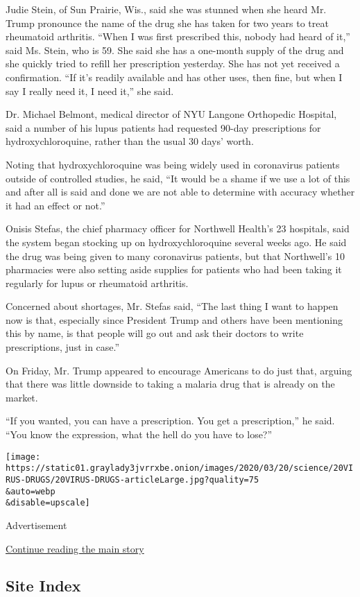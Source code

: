 Judie Stein, of Sun Prairie, Wis., said she was stunned when she heard
Mr. Trump pronounce the name of the drug she has taken for two years to
treat rheumatoid arthritis. ``When I was first prescribed this, nobody
had heard of it,'' said Ms. Stein, who is 59. She said she has a
one-month supply of the drug and she quickly tried to refill her
prescription yesterday. She has not yet received a confirmation. ``If
it's readily available and has other uses, then fine, but when I say I
really need it, I need it,'' she said.

Dr. Michael Belmont, medical director of NYU Langone Orthopedic
Hospital, said a number of his lupus patients had requested 90-day
prescriptions for hydroxychloroquine, rather than the usual 30 days'
worth.

Noting that hydroxychloroquine was being widely used in coronavirus
patients outside of controlled studies, he said, ``It would be a shame
if we use a lot of this and after all is said and done we are not able
to determine with accuracy whether it had an effect or not.''

Onisis Stefas, the chief pharmacy officer for Northwell Health's 23
hospitals, said the system began stocking up on hydroxychloroquine
several weeks ago. He said the drug was being given to many coronavirus
patients, but that Northwell's 10 pharmacies were also setting aside
supplies for patients who had been taking it regularly for lupus or
rheumatoid arthritis.

Concerned about shortages, Mr. Stefas said, ``The last thing I want to
happen now is that, especially since President Trump and others have
been mentioning this by name, is that people will go out and ask their
doctors to write prescriptions, just in case.''

On Friday, Mr. Trump appeared to encourage Americans to do just that,
arguing that there was little downside to taking a malaria drug that is
already on the market.

``If you wanted, you can have a prescription. You get a prescription,''
he said. ``You know the expression, what the hell do you have to lose?''

\texttt{[image: https://static01.graylady3jvrrxbe.onion/images/2020/03/20/science/20VIRUS-DRUGS/20VIRUS-DRUGS-articleLarge.jpg?quality=75\\\&auto=webp\\\&disable=upscale]}

Advertisement

\protect\hyperlink{after-bottom}{Continue reading the main story}

\hypertarget{site-index}{%
\subsection{Site Index}\label{site-index}}

